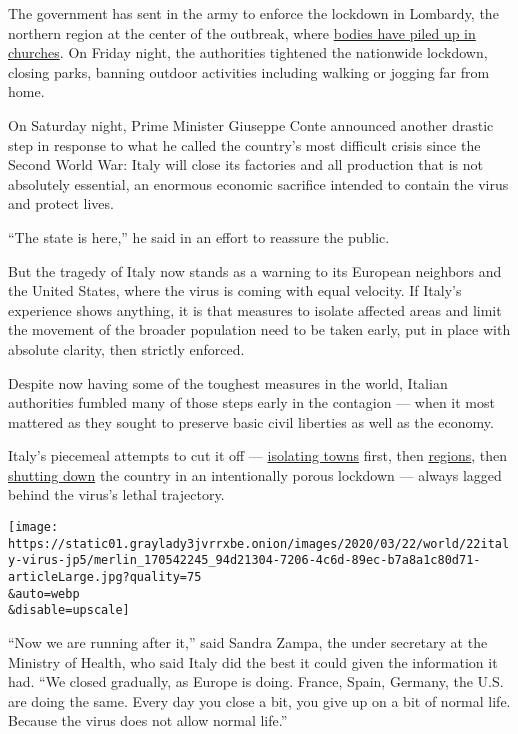 The government has sent in the army to enforce the lockdown in Lombardy,
the northern region at the center of the outbreak, where
\href{https://www.nytimes3xbfgragh.onion/2020/03/16/world/europe/italy-coronavirus-funerals.html?searchResultPosition=5}{bodies
have piled up in churches}. On Friday night, the authorities tightened
the nationwide lockdown, closing parks, banning outdoor activities
including walking or jogging far from home.

On Saturday night, Prime Minister Giuseppe Conte announced another
drastic step in response to what he called the country's most difficult
crisis since the Second World War: Italy will close its factories and
all production that is not absolutely essential, an enormous economic
sacrifice intended to contain the virus and protect lives.

``The state is here,'' he said in an effort to reassure the public.

But the tragedy of Italy now stands as a warning to its European
neighbors and the United States, where the virus is coming with equal
velocity. If Italy's experience shows anything, it is that measures to
isolate affected areas and limit the movement of the broader population
need to be taken early, put in place with absolute clarity, then
strictly enforced.

Despite now having some of the toughest measures in the world, Italian
authorities fumbled many of those steps early in the contagion --- when
it most mattered as they sought to preserve basic civil liberties as
well as the economy.

Italy's piecemeal attempts to cut it off ---
\href{https://www.nytimes3xbfgragh.onion/2020/02/23/world/europe/italy-coronavirus.html?searchResultPosition=42}{isolating
towns} first, then
\href{https://www.nytimes3xbfgragh.onion/2020/03/07/world/europe/coronavirus-italy.html?searchResultPosition=28}{regions},
then
\href{https://www.nytimes3xbfgragh.onion/2020/03/09/world/europe/italy-lockdown-coronavirus.html?searchResultPosition=24}{shutting
down} the country in an intentionally porous lockdown --- always lagged
behind the virus's lethal trajectory.

\texttt{[image: https://static01.graylady3jvrrxbe.onion/images/2020/03/22/world/22italy-virus-jp5/merlin\_170542245\_94d21304-7206-4c6d-89ec-b7a8a1c80d71-articleLarge.jpg?quality=75\\\&auto=webp\\\&disable=upscale]}

``Now we are running after it,'' said Sandra Zampa, the under secretary
at the Ministry of Health, who said Italy did the best it could given
the information it had. ``We closed gradually, as Europe is doing.
France, Spain, Germany, the U.S. are doing the same. Every day you close
a bit, you give up on a bit of normal life. Because the virus does not
allow normal life.''

